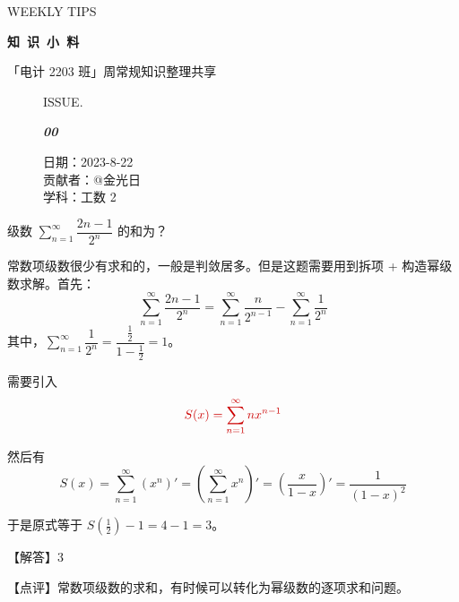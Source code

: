 \documentclass[UTF8]{ctexart}
\makeatletter
\newcommand\Black[1]{\textcolor[gray]{0.3}{#1}}
\newcommand\Brown[1]{\textcolor[HTML]{998A4E}{#1}}
\newcommand\Emph[1]{\colorbox{red!20!}{\textcolor{red!80!black}{#1}}}
\newcommand\IssueNumber{00}
\newcommand\Date{2023-8-22}
\newcommand\Contributer{@金光日}
\newcommand\Subject{工数 2}
\makeatother
\begin{document}
\begin{center}
{\scriptsize\Issue \textcolor[HTML]{C8BA83}{WEEKLY TIPS}}

{\Huge\bfseries\TitleFont \Black{知\ 识\ 小\ 料}}

\vspace{-0.1cm}
{\footnotesize \Brown{「电计 2203 班」周常规知识整理共享}}
\end{center}

\vspace{-0.5cm}

\begin{figure}[H]
\hspace{1cm}
\begin{minipage}[t]{0.3\textwidth}
\centering
    \Brown{ISSUE.}

    \vspace{-0.6cm}
    \Huge \Issue\slshape\bfseries\Black{\IssueNumber}
\end{minipage}
\hfill
\begin{minipage}[t]{0.3\textwidth}
\centering
    \Brown{日期：\Date} \\
\vspace{-0.1cm}
    \Brown{贡献者：\Contributer} \\
\vspace{-0.1cm}
    \Brown{学科：\Subject} \\
\end{minipage}
\hspace{0.8cm}
\end{figure}

\textcolor{cyan!50!black}{
级数 $\displaystyle\sum\limits_{n=1}^\infty  \dfrac{2n-1}{2^n}$ 的和为？
}

\hspace{1cm}

常数项级数很少有求和的，一般是判敛居多。但是这题需要用到\Emph{拆项} + \Emph{构造幂级数}求解。首先：
\begin{equation}
    \sum\limits_{n=1}^\infty  \dfrac{2n-1}{2^n}
    = \sum\limits_{n=1}^\infty  \dfrac{n}{2^{n-1}}
    - \sum\limits_{n=1}^\infty  \dfrac{1}{2^n}
\end{equation}
其中，$\sum\limits_{n=1}^\infty  \dfrac{1}{2^n} = \dfrac{\frac12}{1-\frac12} = 1$。

需要引入
\begin{equation}\textcolor{red!80!black}{
    S(x) = \sum\limits_{n=1}^\infty  nx^{n-1}}
\end{equation}


然后有
\begin{equation*}
    S(x) = \sum\limits_{n=1}^\infty  (x^n)' = \left(\sum\limits_{n=1}^\infty  x^n\right)'  =  \left(\dfrac{x}{1-x}\right)'  =  \dfrac{1}{(1-x)^2}
\end{equation*}

于是原式等于 $S(\frac12) - 1 = 4 - 1 = 3$。


\textcolor{cyan!80!black}{【解答】3}

\textcolor{cyan!80!black}{【点评】常数项级数的求和，有时候可以转化为幂级数的逐项求和问题。}
\end{document}
